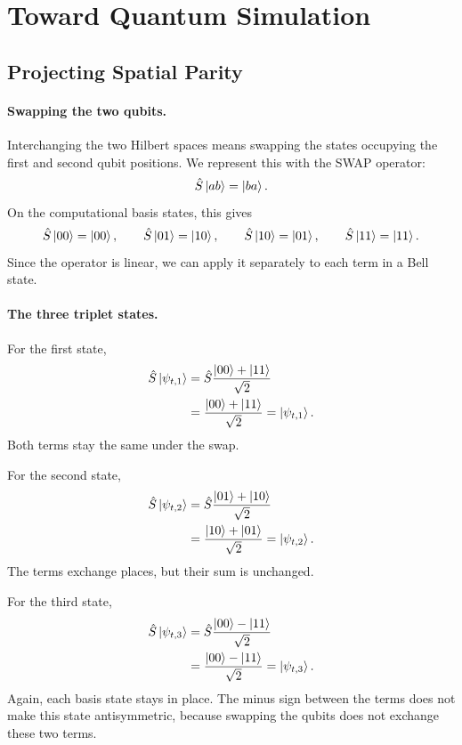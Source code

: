 \documentclass[11pt]{article}
\begin{document}
\setcounter{section}{3}
\section{Toward Quantum Simulation}
\setcounter{subsection}{1}
\subsection{Projecting Spatial Parity}

\paragraph{Swapping the two qubits.}
Interchanging the two Hilbert spaces means swapping the
states occupying the first and second qubit positions.
We represent this with the SWAP operator:
\[
\hat{S}\ket{ab}=\ket{ba}.
\]
On the computational basis states, this gives
\[
\hat{S}\ket{00}=\ket{00},\qquad
\hat{S}\ket{01}=\ket{10},\qquad
\hat{S}\ket{10}=\ket{01},\qquad
\hat{S}\ket{11}=\ket{11}.
\]
Since the operator is linear, we can apply it separately
to each term in a Bell state.

\paragraph{The three triplet states.}
For the first state,
\[
\begin{aligned}
\hat{S}\ket{\psi_{t,1}}
&=\hat{S}\frac{\ket{00}+\ket{11}}{\sqrt{2}}\\
&=\frac{\ket{00}+\ket{11}}{\sqrt{2}}
=\ket{\psi_{t,1}}.
\end{aligned}
\]
Both terms stay the same under the swap.

For the second state,
\[
\begin{aligned}
\hat{S}\ket{\psi_{t,2}}
&=\hat{S}\frac{\ket{01}+\ket{10}}{\sqrt{2}}\\
&=\frac{\ket{10}+\ket{01}}{\sqrt{2}}
=\ket{\psi_{t,2}}.
\end{aligned}
\]
The terms exchange places, but their sum is unchanged.

For the third state,
\[
\begin{aligned}
\hat{S}\ket{\psi_{t,3}}
&=\hat{S}\frac{\ket{00}-\ket{11}}{\sqrt{2}}\\
&=\frac{\ket{00}-\ket{11}}{\sqrt{2}}
=\ket{\psi_{t,3}}.
\end{aligned}
\]
Again, each basis state stays in place. The minus sign
between the terms does not make this state antisymmetric,
because swapping the qubits does not exchange these two terms.
\end{document}
